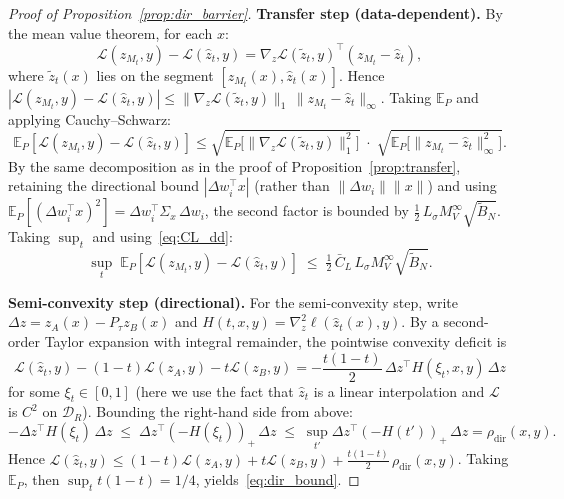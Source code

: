 \documentclass[11pt]{article}
\newcommand{\E}{\mathbb{E}}
\newcommand{\cL}{\mathcal{L}}
\newcommand{\cB}{\mathcal{B}}
\newcommand{\cD}{\mathcal{D}}  %
\begin{document}
\begin{proof}[Proof of Proposition~\ref{prop:dir_barrier}]
\textbf{Transfer step (data-dependent).}
By the mean value theorem, for each $x$:
\[
  \cL(z_{M_t}, y) - \cL(\hat z_t, y)
  = \nabla_z \cL(\tilde z_t, y)^\top (z_{M_t} - \hat z_t),
\]
where $\tilde z_t(x)$ lies on the segment $[z_{M_t}(x), \hat z_t(x)]$.
Hence
$|\cL(z_{M_t}, y) - \cL(\hat z_t, y)|
\le \|\nabla_z \cL(\tilde z_t, y)\|_1\,\|z_{M_t} - \hat z_t\|_\infty$.
Taking $\E_P$ and applying Cauchy--Schwarz:
\[
  \E_P[\cL(z_{M_t}, y) - \cL(\hat z_t, y)]
  \le \sqrt{\E_P\!\bigl[\|\nabla_z \cL(\tilde z_t, y)\|_1^2\bigr]}
  \;\cdot\;
  \sqrt{\E_P\!\bigl[\|z_{M_t} - \hat z_t\|_\infty^2\bigr]}.
\]
By the same decomposition as in the proof of
Proposition~\ref{prop:transfer}, retaining the directional bound
$|\Delta w_i^\top x|$ (rather than $\|\Delta w_i\|\|x\|$) and
using $\E_P[(\Delta w_i^\top x)^2] = \Delta w_i^\top \Sigma_x\,\Delta w_i$,
the second factor is bounded by
$\tfrac{1}{2}\,L_\sigma M_V^\infty \sqrt{\tilde B_N}$.
Taking $\sup_t$ and using~\eqref{eq:CL_dd}:
\[
  \sup_t\;\E_P[\cL(z_{M_t}, y) - \cL(\hat z_t, y)]
  \;\le\; \tfrac{1}{2}\,\bar C_L\, L_\sigma M_V^\infty \sqrt{\tilde B_N}.
\]

\textbf{Semi-convexity step (directional).}
For the semi-convexity step,
write $\Delta z = z_A(x) - P_\tau z_B(x)$ and
$H(t,x,y) = \nabla^2_z \ell(\hat z_t(x),y)$.
By a second-order Taylor expansion with integral remainder,
the pointwise convexity deficit is
\[
  \cL(\hat z_t, y)
  - (1-t)\cL(z_A, y) - t\cL(z_B, y)
  = -\frac{t(1-t)}{2}\,
    \Delta z^\top H(\xi_t, x, y)\,\Delta z
\]
for some $\xi_t \in [0,1]$
(here we use the fact that $\hat z_t$ is a linear interpolation and
$\cL$ is $C^2$ on $\cD_R$).
Bounding the right-hand side from above:
\[
  -\Delta z^\top H(\xi_t)\,\Delta z
  \;\le\;
  \Delta z^\top (-H(\xi_t))_+ \,\Delta z
  \;\le\;
  \sup_{t'} \Delta z^\top (-H(t'))_+\, \Delta z
  = \rho_{\mathrm{dir}}(x,y).
\]
Hence
$\cL(\hat z_t, y)
\le (1-t)\cL(z_A, y) + t\cL(z_B, y)
  + \frac{t(1-t)}{2}\,\rho_{\mathrm{dir}}(x,y)$.
Taking $\E_P$, then $\sup_t t(1-t) = 1/4$,
yields~\eqref{eq:dir_bound}.
\end{proof}
\end{document}
